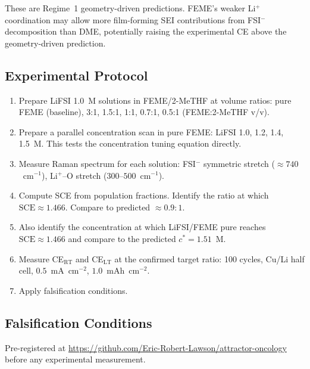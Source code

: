 \documentclass[11pt]{article}
\theoremstyle{plain}
\theoremstyle{definition}
\theoremstyle{remark}
\begin{document}
These are Regime~1 geometry-driven predictions.  FEME's weaker
Li$^+$ coordination may allow more film-forming SEI contributions
from FSI$^-$ decomposition than DME, potentially raising the
experimental CE above the geometry-driven prediction.

\subsection{Experimental Protocol}

\begin{enumerate}[leftmargin=2em]
  \item Prepare LiFSI 1.0~M solutions in FEME/2-MeTHF at volume
        ratios: pure FEME (baseline), 3:1, 1.5:1, 1:1, 0.7:1,
        0.5:1 (FEME:2-MeTHF v/v).
  \item Prepare a parallel concentration scan in pure FEME:
        LiFSI 1.0, 1.2, 1.4, 1.5~M.  This tests the concentration
        tuning equation directly.
  \item Measure Raman spectrum for each solution: FSI$^-$ symmetric
        stretch ($\approx 740$~cm$^{-1}$), Li$^+$--O stretch
        ($300$--$500$~cm$^{-1}$).
  \item Compute SCE from population fractions.  Identify the ratio
        at which $\mathrm{SCE} \approx 1.466$.  Compare to predicted
        $\approx 0.9:1$.
  \item Also identify the concentration at which LiFSI/FEME pure
        reaches $\mathrm{SCE} \approx 1.466$ and compare to the
        predicted $c^{*} = 1.51$~M.
  \item Measure CE$_\mathrm{RT}$ and CE$_\mathrm{LT}$ at the
        confirmed target ratio: 100 cycles, Cu/Li half cell,
        $0.5$~mA~cm$^{-2}$, $1.0$~mAh~cm$^{-2}$.
  \item Apply falsification conditions.
\end{enumerate}

\subsection{Falsification Conditions}

Pre-registered at
\url{https://github.com/Eric-Robert-Lawson/attractor-oncology}
before any experimental measurement.
\end{document}
